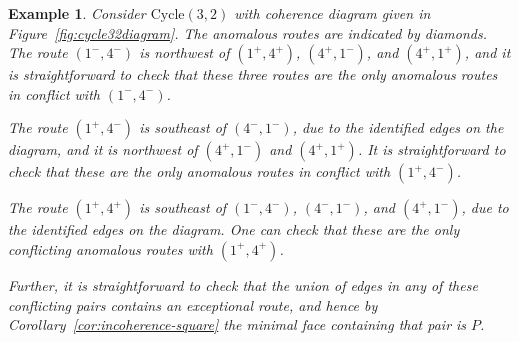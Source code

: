 \documentclass[10pt,a4paper]{amsart}
\newtheorem{example}{Example}
\newcommand\Cycle{\mathrm{Cycle}}
\begin{document}
\begin{example}\label{ex:anomalouslemma}
    Consider $\Cycle(3,2)$ with coherence diagram given in Figure~\ref{fig:cycle32diagram}.
    The anomalous routes are indicated by diamonds.
    The route $(1^-,4^-)$ is northwest of $(1^+,4^+)$, $(4^+,1^-)$, and $(4^+,1^+)$, and it is straightforward to check that these three routes are the only anomalous routes in conflict with $(1^-,4^-)$.

    The route $(1^+,4^-)$ is southeast of $(4^-,1^-)$, due to the identified edges on the diagram, and it is northwest of $(4^+,1^-)$ and $(4^+,1^+)$.
    It is straightforward to check that these are the only anomalous routes in conflict with $(1^+,4^-)$.

    The route $(1^+,4^+)$ is southeast of $(1^-,4^-)$, $(4^-,1^-)$, and $(4^+,1^-)$, due to the identified edges on the diagram.
    One can check that these are the only conflicting anomalous routes with $(1^+,4^+)$.

     Further, it is straightforward to check that the union of edges in any of these conflicting pairs contains an exceptional route, and hence by Corollary~\ref{cor:incoherence-square} the minimal face containing that pair is $P$.
\end{example}
\end{document}
